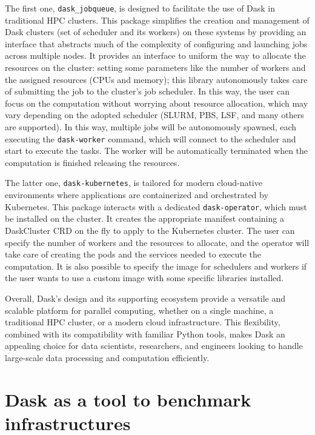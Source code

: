 The first one, \texttt{dask\_jobqueue}, is designed to facilitate the use of
Dask in traditional HPC clusters.
This package simplifies the creation and management of Dask clusters (set of
scheduler and its workers) on these systems by providing an interface that
abstracts much of the complexity of configuring and launching jobs across
multiple nodes.
It provides an interface to uniform the way to allocate the resources on the
cluster: setting some parameters like the number of workers and the assigned
resources (CPUs and memory); this library autonomously takes care of submitting
the job to the cluster's job scheduler.
In this way, the user can focus on the computation without worrying about
resource allocation, which may vary depending on the adopted scheduler (SLURM,
PBS, LSF, and many others are supported).
In this way, multiple jobs will be autonomously spawned, each executing the
\texttt{dask-worker} command, which will connect to the scheduler and start to
execute the tasks. The worker will be automatically terminated when the
computation is finished releasing the resources.

The latter one, \texttt{dask-kubernetes}, is tailored for modern cloud-native
environments where applications are containerized and orchestrated by
Kubernetes.
This package interacts with a dedicated \texttt{dask-operator}, which must be
installed on the cluster. It creates the appropriate manifest containing a
DaskCluster CRD on the fly to apply to the Kubernetes cluster.
The user can specify the number of workers and the resources to allocate, and
the operator will take care of creating the pods and the services needed to
execute the computation.
It is also possible to specify the image for schedulers and workers if the user
wants to use a custom image with some specific libraries installed.

Overall, Dask's design and its supporting ecosystem provide a versatile and
scalable platform for parallel computing, whether on a single machine, a
traditional HPC cluster, or a modern cloud infrastructure. This flexibility,
combined with its compatibility with familiar Python tools, makes Dask an
appealing choice for data scientists, researchers, and engineers looking to
handle large-scale data processing and computation efficiently.

\section{Dask as a tool to benchmark infrastructures}\label{sec:daskbenchmark}

